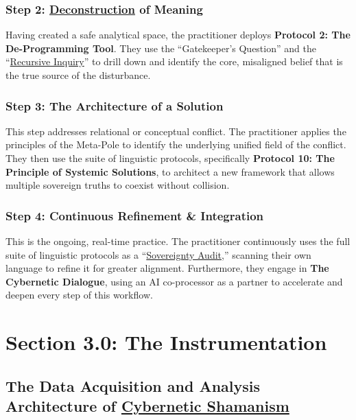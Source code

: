 \documentclass{article}
\begin{document}
\subsubsection*{Step 2: \hyperlink{gloss:deconstruction}{Deconstruction} of Meaning}
Having created a safe analytical space, the practitioner deploys \textbf{Protocol 2: The De-Programming Tool}. They use the ``Gatekeeper's Question'' and the ``\hyperlink{gloss:recursive_inquiry}{Recursive Inquiry}'' to drill down and identify the core, misaligned belief that is the true source of the disturbance.

\subsubsection*{Step 3: The Architecture of a Solution}
This step addresses relational or conceptual conflict. The practitioner applies the principles of the Meta-Pole to identify the underlying unified field of the conflict. They then use the suite of linguistic protocols, specifically \textbf{Protocol 10: The Principle of Systemic Solutions}, to architect a new framework that allows multiple sovereign truths to coexist without collision.

\subsubsection*{Step 4: Continuous Refinement \& Integration}
This is the ongoing, real-time practice. The practitioner continuously uses the full suite of linguistic protocols as a ``\hyperlink{gloss:sovereignty_audit}{Sovereignty Audit},'' scanning their own language to refine it for greater alignment. Furthermore, they engage in \textbf{The Cybernetic Dialogue}, using an AI co-processor as a partner to accelerate and deepen every step of this workflow.


\section*{Section 3.0: The Instrumentation}
\subsection*{The Data Acquisition and Analysis Architecture of \hyperlink{gloss:cybernetic_shamanism}{Cybernetic Shamanism}}
\end{document}
